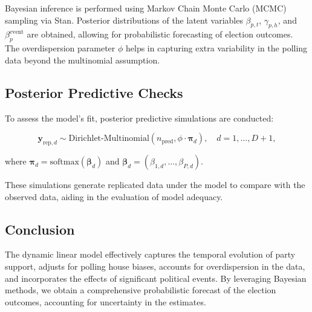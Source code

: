 \documentclass[
  letterpaper,
  DIV=11,
  numbers=noendperiod]{scrartcl}
\begin{document}
Bayesian inference is performed using Markov Chain Monte Carlo (MCMC)
sampling via Stan. Posterior distributions of the latent variables
\(\beta_{p,t}\), \(\gamma_{p,h}\), and \(\beta^{\text{event}}_p\) are
obtained, allowing for probabilistic forecasting of election outcomes.
The overdispersion parameter \(\phi\) helps in capturing extra
variability in the polling data beyond the multinomial assumption.

\subsection{Posterior Predictive
Checks}\label{posterior-predictive-checks}

To assess the model's fit, posterior predictive simulations are
conducted:

\[
\mathbf{y}_{\text{rep}, d} \sim \text{Dirichlet-Multinomial}\left(n_{\text{pred}}, \phi \cdot \boldsymbol{\pi}_{d}\right), \quad d = 1, \dots, D+1,
\]

where
\(\boldsymbol{\pi}_{d} = \text{softmax}\left(\boldsymbol{\beta}_{d}\right)\)
and
\(\boldsymbol{\beta}_{d} = \left(\beta_{1,d}, \dots, \beta_{P,d}\right)\).

These simulations generate replicated data under the model to compare
with the observed data, aiding in the evaluation of model adequacy.

\subsection{Conclusion}\label{conclusion}

The dynamic linear model effectively captures the temporal evolution of
party support, adjusts for polling house biases, accounts for
overdispersion in the data, and incorporates the effects of significant
political events. By leveraging Bayesian methods, we obtain a
comprehensive probabilistic forecast of the election outcomes,
accounting for uncertainty in the estimates.
\end{document}
